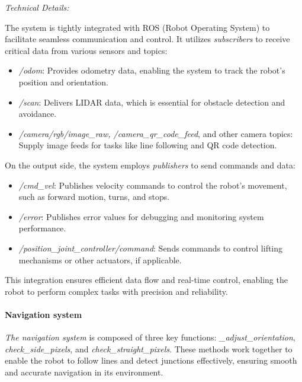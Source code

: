\documentclass[a4paper,12pt]{extreport}
\begin{document}
\emph{Technical Details:}

The system is tightly integrated with ROS (Robot Operating System) to
facilitate seamless communication and control. It utilizes
\emph{subscribers} to receive critical data from various sensors and
topics:

\begin{itemize}
\item
  \emph{/odom}: Provides odometry data, enabling the system to track the
  robot's position and orientation.
\item
  \emph{/scan}: Delivers LIDAR data, which is essential for obstacle
  detection and avoidance.
\item
  \emph{/camera/rgb/image\_raw, /camera\_qr\_code\_feed}, and other
  camera topics: Supply image feeds for tasks like line following and QR
  code detection.
\end{itemize}

On the output side, the system employs \emph{publishers} to send
commands and data:

\begin{itemize}
\item
  \emph{/cmd\_vel}: Publishes velocity commands to control the robot's
  movement, such as forward motion, turns, and stops.
\item
  \emph{/error}: Publishes error values for debugging and monitoring
  system performance.
\item
  \emph{/position\_joint\_controller/command}: Sends commands to control
  lifting mechanisms or other actuators, if applicable.
\end{itemize}

This integration ensures efficient data flow and real-time control,
enabling the robot to perform complex tasks with precision and
reliability.

\paragraph{Navigation system}

\emph{The navigation system} is composed of three key functions:
\emph{\_adjust\_orientation}, \emph{check\_side\_pixels}, and
\emph{check\_straight\_pixels}. These methods work together to enable
the robot to follow lines and detect junctions effectively, ensuring
smooth and accurate navigation in its environment.
\end{document}
